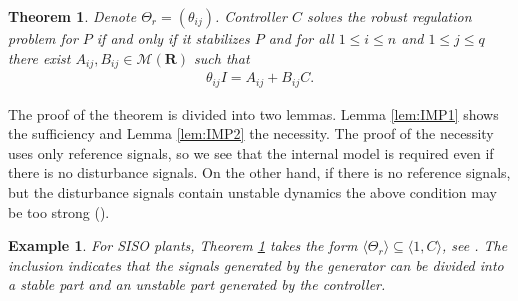 \documentclass[11pt, a4paper]{amsart}
\newtheorem{theorem}{Theorem}[section]
\newtheorem{exa}{Example}
\newcommand{\matrices}[1]{\mathcal{M}\left( #1 \right)}		%
\newcommand{\Plant}{P}										%
\newcommand{\Cont}{C}										%
\newcommand{\Gen}{\Theta}									%
\newcommand{\gen}{\theta}									%
\newcommand{\outd}{n}										%
\newcommand{\stable}{\mathbf{R}}							%
\begin{document}
\begin{theorem}\label{thm:IMP}
Denote $\Gen_r=(\gen_{ij})$. Controller $\Cont$ solves the robust regulation problem for $\Plant$ if and only if it stabilizes $\Plant$ and for all $1\leq i\leq \outd$ and $1\leq j\leq q$ there exist $A_{ij},B_{ij}\in\matrices{\stable}$ such that 
\begin{align}\label{eqn:RORPSolvability}
\gen_{ij} I=A_{ij}+B_{ij}\Cont.
\end{align}
\end{theorem}

The proof of the theorem is divided into two lemmas. Lemma \ref{lem:IMP1} shows the sufficiency and Lemma \ref{lem:IMP2} the necessity. The proof of the necessity uses only reference signals, so we see that the internal model is required even if there is no disturbance signals. On the other hand, if there is no reference signals, but the disturbance signals contain unstable dynamics the above condition may be too strong (\cite{LaakkonenPohjolainen2015}).

\begin{exa}
For SISO plants, Theorem \ref{thm:IMP} takes the form $\langle \Gen_r\rangle\subseteq \langle 1,\Cont\rangle$, see \cite{LaakkonenQuadrat2015}. The inclusion indicates that the signals generated by the generator can be divided into a stable part and an unstable part generated by the controller.
\end{exa}
\end{document}
